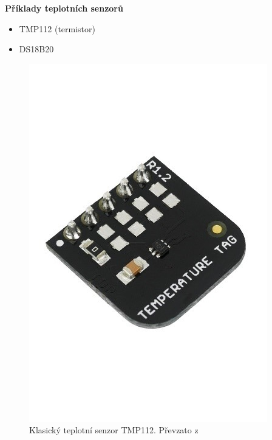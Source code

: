 \noindent\textbf{Příklady teplotních senzorů}
\begin{itemize}
  \item TMP112 (termistor)
  \item DS18B20
  \end{itemize}

\begin{figure}[H]
  \centering
  \begin{minipage}[b]{0.3\textwidth}
    \includegraphics[width=\textwidth]{obrazky-figures/hardwareComponents/temperatureTag.jpg}
    \caption{Klasický teplotní senzor TMP112. Převzato z~\cite{hardwario-module-overview}}
    \label{temperatureTag}
  \end{minipage}
  \hfill
  \begin{minipage}[b]{0.3\textwidth}

\end{minipage}
\end{figure}
